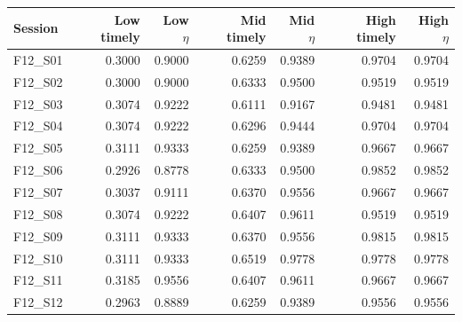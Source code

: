 \begin{tabular}{@{}lrrrrrr@{}}
\toprule
Session & Low timely & Low $\eta$ & Mid timely & Mid $\eta$ & High timely & High $\eta$ \\
\midrule
F12\_S01 & 0.3000 & 0.9000 & 0.6259 & 0.9389 & 0.9704 & 0.9704 \\
F12\_S02 & 0.3000 & 0.9000 & 0.6333 & 0.9500 & 0.9519 & 0.9519 \\
F12\_S03 & 0.3074 & 0.9222 & 0.6111 & 0.9167 & 0.9481 & 0.9481 \\
F12\_S04 & 0.3074 & 0.9222 & 0.6296 & 0.9444 & 0.9704 & 0.9704 \\
F12\_S05 & 0.3111 & 0.9333 & 0.6259 & 0.9389 & 0.9667 & 0.9667 \\
F12\_S06 & 0.2926 & 0.8778 & 0.6333 & 0.9500 & 0.9852 & 0.9852 \\
F12\_S07 & 0.3037 & 0.9111 & 0.6370 & 0.9556 & 0.9667 & 0.9667 \\
F12\_S08 & 0.3074 & 0.9222 & 0.6407 & 0.9611 & 0.9519 & 0.9519 \\
F12\_S09 & 0.3111 & 0.9333 & 0.6370 & 0.9556 & 0.9815 & 0.9815 \\
F12\_S10 & 0.3111 & 0.9333 & 0.6519 & 0.9778 & 0.9778 & 0.9778 \\
F12\_S11 & 0.3185 & 0.9556 & 0.6407 & 0.9611 & 0.9667 & 0.9667 \\
F12\_S12 & 0.2963 & 0.8889 & 0.6259 & 0.9389 & 0.9556 & 0.9556 \\
\bottomrule
\end{tabular}
